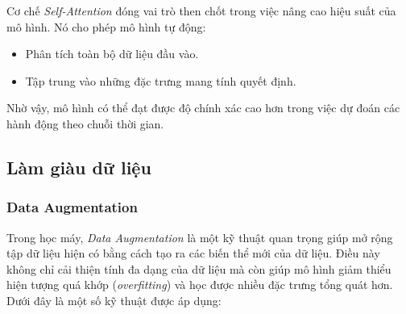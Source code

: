 \noindent
Cơ chế \textit{Self-Attention} đóng vai trò then chốt trong việc nâng cao hiệu suất của mô hình. Nó cho phép mô hình tự động:
\begin{itemize}
    \item Phân tích toàn bộ dữ liệu đầu vào.
    \item Tập trung vào những đặc trưng mang tính quyết định.
\end{itemize}

Nhờ vậy, mô hình có thể đạt được độ chính xác cao hơn trong việc dự đoán các hành động theo chuỗi thời gian.

\subsection{Làm giàu dữ liệu}
\subsubsection{Data Augmentation}

Trong học máy, \textit{Data Augmentation} là một kỹ thuật quan trọng giúp mở rộng tập dữ liệu hiện có bằng cách tạo ra các biến thể mới của dữ liệu. Điều này không chỉ cải thiện tính đa dạng của dữ liệu mà còn giúp mô hình giảm thiểu hiện tượng quá khớp (\textit{overfitting}) và học được nhiều đặc trưng tổng quát hơn. Dưới đây là một số kỹ thuật được áp dụng:

